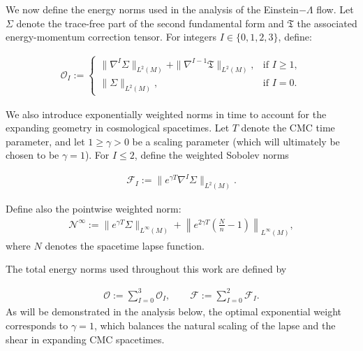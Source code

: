 \documentclass{amsart}
\begin{document}
\noindent We now define the energy norms used in the analysis of the Einstein$-\Lambda$ flow. Let \( \Sigma \) denote the trace-free part of the second fundamental form and \( \mathfrak{T} \) the associated energy-momentum correction tensor. For integers \( I \in \{0, 1, 2, 3\} \), define:

\begin{align} \label{eq:OI}
\mathcal{O}_I := 
\begin{cases}
\| \nabla^I \Sigma \|_{L^2(M)} + \| \nabla^{I-1} \mathfrak{T} \|_{L^2(M)}, & \text{if } I \geq 1, \\
\| \Sigma \|_{L^2(M)}, & \text{if } I = 0.
\end{cases}
\end{align}

\noindent We also introduce exponentially weighted norms in time to account for the expanding geometry in cosmological spacetimes. Let \( T \) denote the CMC time parameter, and let \( 1\geq \gamma > 0 \) be a scaling parameter (which will ultimately be chosen to be \( \gamma = 1 \)). For \( I \leq 2 \), define the weighted Sobolev norms

\begin{align} \label{eq:FI}
\mathcal{F}_I := \| e^{\gamma T} \nabla^I \Sigma \|_{L^2(M)}.
\end{align}

\noindent Define also the pointwise weighted norm:
\begin{align} \label{eq:infty-norm}
\mathcal{N}^\infty := \| e^{\gamma T} \Sigma \|_{L^\infty(M)} + \left\| e^{2\gamma T} \left( \frac{N}{n} - 1 \right) \right\|_{L^\infty(M)},
\end{align}
where \( N \) denotes the spacetime lapse function.

\noindent The total energy norms used throughout this work are defined by

\begin{align} \label{eq:O}
\mathcal{O} := \sum_{I=0}^3 \mathcal{O}_I, \qquad \mathcal{F} := \sum_{I=0}^2 \mathcal{F}_I.
\end{align}
As will be demonstrated in the analysis below, the optimal exponential weight corresponds to \( \gamma = 1 \), which balances the natural scaling of the lapse and the shear in expanding CMC spacetimes.
\end{document}
